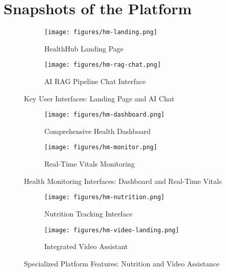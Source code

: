 \section{Snapshots of the Platform}
\begin{figure}[H]
    \centering
    \begin{subfigure}{0.8\textwidth}
        \centering
        \texttt{[image: figures/hm-landing.png]}
        \caption{HealthHub Landing Page}
        \label{fig:landing_page_showcase}
    \end{subfigure}
    \vspace{1em} %
    \begin{subfigure}{0.8\textwidth}
        \centering
        \texttt{[image: figures/hm-rag-chat.png]}
        \caption{AI RAG Pipeline Chat Interface}
        \label{fig:rag_chat_showcase}
    \end{subfigure}
    \caption{Key User Interfaces: Landing Page and AI Chat}
    \label{fig:ui_showcase_pair1}
\end{figure}

\begin{figure}[H]
    \centering
    \begin{subfigure}{\textwidth}
        \centering
        \texttt{[image: figures/hm-dashboard.png]}
        \caption{Comprehensive Health Dashboard}
        \label{fig:dashboard_showcase}
    \end{subfigure}
    \vspace{1em} %
    \begin{subfigure}{\textwidth}
        \centering
        \texttt{[image: figures/hm-monitor.png]}
        \caption{Real-Time Vitals Monitoring}
        \label{fig:monitor_showcase}
    \end{subfigure}
    \caption{Health Monitoring Interfaces: Dashboard and Real-Time Vitals}
    \label{fig:monitoring_showcase_pair2}
\end{figure}

\begin{figure}[H]
    \centering
    \begin{subfigure}{\textwidth}
        \centering
        \texttt{[image: figures/hm-nutrition.png]}
        \caption{Nutrition Tracking Interface}
        \label{fig:nutrition_showcase}
    \end{subfigure}
    \vspace{1em} %
    \begin{subfigure}{\textwidth}
        \centering
        \texttt{[image: figures/hm-video-landing.png]}
        \caption{Integrated Video Assistant}
        \label{fig:video_assistant_showcase}
    \end{subfigure}
    \caption{Specialized Platform Features: Nutrition and Video Assistance}
    \label{fig:specialized_features_pair3}
\end{figure}

